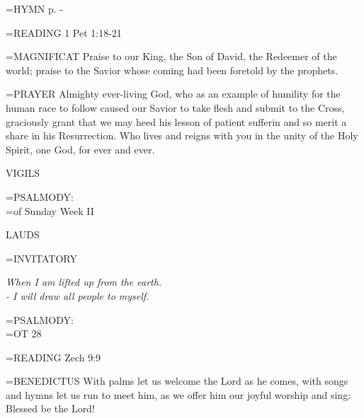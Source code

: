\hangindent=\parindent \small{\uppercase{HYMN} p.  \pageref{holyweek:firstHymn} - \pageref{holyweek:lastHymn}\\}

\hangindent=\parindent \small{READING}    1 Pet 1:18-21 \textbf{   \\}

\hangindent=\parindent \small{MAGNIFICAT 	Praise to our King, the Son of David, the Redeemer of the world; praise to the Savior whose coming had been foretold by the prophets.\\}

\hangindent=\parindent \small{PRAYER 	Almighty ever-living God, who as an example of humility for the human race to follow caused our Savior to take flesh and submit to the Cross, graciously grant that we may heed his lesson of patient sufferin and so merit a share in his Resurrection. Who lives and reigns with you in the unity of the Holy Spirit, one God, for ever and ever.}

\begin{flushleft}\normalsize VIGILS\\\end{flushleft}

\hangindent=\parindent \small{PSALMODY:}\\
\hangindent=\parindent  of Sunday Week II\vspace{0.5em}

\begin{flushleft}\normalsize LAUDS\\\end{flushleft}

\hangindent=\parindent \small{INVITATORY}
\begin{center}
\textit{When I am lifted up from the earth.\\}
\textit{- I will draw all people to myself.\\}
\end{center}

\hangindent=\parindent \small{PSALMODY:}\\
\hangindent=\parindent  OT 28\vspace{0.5em}


\hangindent=\parindent \small{READING}    Zech 9:9 \textbf{   \\}

\hangindent=\parindent \small{BENEDICTUS 	With palms let us welcome the Lord as he comes, with songs and hymns let us run to meet him, as we offer him our joyful worship and sing: Blessed be the Lord!\\}

